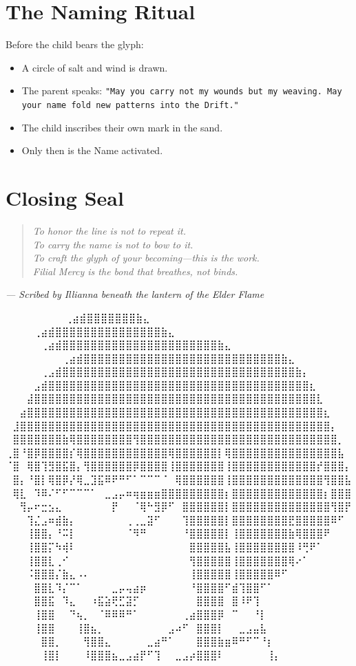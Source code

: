 \section*{The Naming Ritual}
Before the child bears the glyph:
\begin{itemize}
    \item A circle of salt and wind is drawn.
    \item The parent speaks:  
    \texttt{"May you carry not my wounds but my weaving.  
    May your name fold new patterns into the Drift."}
    \item The child inscribes their own mark in the sand.
    \item Only then is the Name activated.
\end{itemize}

\section*{Closing Seal}
\begin{quote}\itshape
To honor the line is not to repeat it.\\
To carry the name is not to bow to it.\\
To craft the glyph of your becoming—this is the work.\\
Filial Mercy is the bond that breathes, not binds.
\end{quote}

\begin{flushright}
\textit{— Scribed by Illianna beneath the lantern of the Elder Flame}
\end{flushright}

\iffalse
⠀⠀⠀⠀⠀⠀             ⠀⠀⢀⣴⣾⣿⣿⣿⣿⣿⣿⣿⣷⣄⠀⠀⠀⠀⠀⠀⠀⠀
⠀⠀⠀  ⠀      ⠀⠀⠀⠀⢀⣴⣾⣿⣿⣿⣿⣿⣿⣿⣿⣿⣿⣿⣿⣿⣿⣿⣷⣄⠀⠀⠀⠀⠀⠀⠀⠀
⠀⠀ ⠀   ⠀⠀⠀⠀⠀⢀⣴⣾⣿⣿⣿⣿⣿⣿⣿⣿⣿⣿⣿⣿⣿⣿⣿⣿⣿⣿⣿⣿⣿⣿⣷⣄⠀⠀⠀⠀⠀⠀⠀⠀
⠀⠀⠀⠀⠀⠀⠀⠀⢀⣴⣾⣿⣿⣿⣿⣿⣿⣿⣿⣿⣿⣿⣿⣿⣿⣿⣿⣿⣿⣿⣿⣿⣿⣿⣿⣿⣿⣿⣿⣷⣄⠀⠀⠀⠀⠀⠀⠀⠀
⠀⠀⠀⠀⠀⢀⣠⣾⣿⣿⣿⣿⣿⣿⣿⣿⣿⣿⣿⣿⣿⣿⣿⣿⣿⣿⣿⣿⣿⣿⣿⣿⣿⣿⣿⣿⣿⣿⣿⣿⣿⣷⡄⠀⠀⠀⠀⠀⠀
⠀⠀⠀⠀⣠⣾⣿⣿⣿⣿⣿⣿⣿⣿⣿⣿⣿⣿⣿⣿⣿⣿⣿⣿⣿⣿⣿⣿⣿⣿⣿⣿⣿⣿⣿⣿⣿⣿⣿⣿⣿⣿⣿⣆⠀⠀⠀⠀⠀
⠀⠀⠀⣼⣿⣿⣿⣿⣿⣿⣿⣿⣿⣿⣿⣿⣿⣿⣿⣿⣿⣿⣿⣿⣿⣿⣿⣿⣿⣿⣿⣿⣿⣿⣿⣿⣿⣿⣿⣿⣿⣿⣿⣿⣇⠀⠀⠀⠀
⠀⠀⣴⣿⣿⣿⣿⣿⣿⣿⣿⣿⣿⣿⣿⣿⣿⣿⣿⣿⣿⣿⣿⣿⣿⣿⣿⣿⣿⣿⣿⣿⣿⣿⣿⣿⣿⣿⣿⣿⣿⣿⣿⣿⣿⣆⠀⠀⠀
⠀⣸⣿⣿⣿⣿⣿⣿⣿⣿⣿⣿⣿⣿⣿⣿⣿⣿⣿⣿⣿⣿⣿⣿⣿⣿⣿⣿⣿⣿⣿⣿⣿⣿⣿⣿⣿⣿⣿⣿⣿⣿⣿⣿⣿⣿⡄⠀⠀
⠀⣿⣿⣿⣿⣿⣿⣿⣷⢿⣿⣿⣿⣿⣿⣿⣿⣿⢻⣿⣿⣿⣿⣿⣿⣿⣿⣿⣿⣿⣿⣿⣿⣿⣿⣿⣿⣿⣿⣿⣿⣿⣿⣿⣿⣿⣿⡀⠀
⢀⣿⠘⣿⡿⣿⣿⣿⣿⡎⢿⣿⣿⣿⣿⣿⣿⣿⣿⣿⣿⣿⣿⢿⣿⣿⣿⣿⣿⣿⡇⢿⣿⣿⣿⣿⣿⣿⣿⣿⣿⣿⣿⣿⣿⣿⣿⣧⠀
⠈⣿⠀⢿⣿⢹⣻⣿⣯⣿⡄⢻⣿⣿⣿⣿⣿⣿⡿⣿⣿⣿⣿⢸⣿⣿⣿⣿⣿⣿⣿⢸⣿⣿⣿⣿⣿⣿⣿⣿⣿⣿⣿⣿⡞⣿⣿⣿⡄
⠀⣿⡄⠘⣿⡇⢿⣿⡿⡜⢿⣀⣹⣯⠿⠟⠛⠋⠁⠉⠉⠉⠈⠀⢿⣿⣿⣿⣿⣿⣿⢸⣿⣿⣿⣿⣿⣿⣿⣿⣿⣿⣿⣿⣿⢻⣿⣿⣧
⠀⢿⣇⠀⠹⠿⠌⠋⠋⠉⠉⠉⠁⠀⣀⣠⡤⠶⢶⣶⣶⣶⣿⣿⣿⣿⣿⣿⣿⣿⣿⡆⣿⣿⣿⣿⣿⣿⣿⣿⣿⣿⣿⣿⣿⡆⣿⣿⣿
⠀⠀⢻⡤⠖⣒⣢⣄⠀⠀⠀⠀⠀⠀⠀⡟⠀⠀⠈⢿⠓⣻⡿⠋⠀⣿⣿⣿⣿⣿⣿⡇⣿⣿⣿⣿⣿⣿⣿⣿⣿⣿⣿⣿⣿⣿⢻⣿⡟
⠀⠀⠀⢹⣌⣠⠶⣾⣷⡄⠀⠀⠀⠀⠀⠀⠀⢀⢀⣀⣽⠋⠀⠀⠀⢹⣿⣿⣿⣿⣿⡇⣿⣿⣿⣿⣿⣿⣿⣿⣟⣿⣿⣿⣿⣿⠿⠋⠀
⠀⠀⠀⢸⣿⣿⡄⠘⠭⡇⠀⠀⠀⠀⠀⠀⠀⠈⠻⠛⠀⠀⠀⠀⠀⠘⣿⣿⣿⣿⣿⡇⢸⣿⣿⣿⣿⣿⣿⣿⣷⢿⣿⣿⣿⠟⠀⠀⠀
⠀⠀⠀⢸⣿⣿⡍⠳⢾⠇⠀⠀⠀⠀⠀⠀⠀⠀⠀⠀⠀⠀⠀⠀⠀⠀⣿⣿⣿⣿⣿⣧⢸⣿⣿⣿⣿⣿⣿⣿⣿⠸⢛⠟⠁⠀⠀⠀⠀
⠀⠀⠀⢸⣿⣿⣇⢀⠊⠀⠀⠀⠀⠀⠀⠀⠀⠀⠀⠀⠀⠀⠀⠀⠀⠀⢻⣿⣿⣿⣿⣿⢸⣿⣿⣿⣿⣿⣿⣿⢿⠔⠁⠀⠀⠀⠀⠀⠀
⠀⠀⠀⠨⣿⣿⣿⡌⣷⣄⠠⠄⠀⠀⠀⠀⠀⠀⠀⠀⠀⠀⠀⠀⠀⠀⢸⣿⣿⣿⣿⣿⢸⣿⣿⣿⣿⣿⠿⠋⠀⠀⠀⠀⠀⠀⠀⠀⠀
⠀⠀⠀⠀⣿⣿⣇⠹⡌⠉⠁⠀⠀⠀⠀⣀⡤⢤⣴⡶⠀⠀⠀⠀⠀⠀⠘⣿⣿⣿⣿⠋⣾⢹⣿⣿⠋⠁⠀⠀⠀⠀⠀⠀⠀⠀⠀⠀⠀
⠀⠀⠀⠀⣿⣿⣯⠀⠹⣄⠀⠀⠰⣯⣵⢟⣋⣽⡋⠀⠀⠀⠀⠀⠀⠀⠀⣿⣿⣿⣿⠀⣿⠸⠟⢹⠀⠀⠀⠀⠀⠀⠀⠀⠀⠀⠀⠀⠀
⠀⠀⠀⠀⢸⣿⣿⠀⠀⠙⢦⡀⠀⠈⠿⠿⠿⠛⠁⠀⠀⠀⠀⠀⠀⢀⣴⣿⣿⣿⡿⠀⠉⠀⠀⠘⡇⠀⠀⠀⠀⠀⠀⠀⠀⠀⠀⠀⠀
⠀⠀⠀⠀⢸⣿⣿⠀⠀⠀⢸⣿⣦⡀⠀⠀⠀⠀⠀⠀⠀⠀⠀⣠⠴⠋⠀⣿⣿⣿⡇⠀⠀⣀⣠⣤⣧⠀⠀⠀⠀⠀⠀⠀⠀⠀⠀⠀⠀
⠀⠀⠀⠀⠀⣿⣿⡀⠀⠀⠀⢻⣿⣿⣄⠀⠀⠀⠀⠀⣀⣴⠛⠁⠀⠀⠀⣿⣿⣿⣷⣶⠿⠛⠋⠉⠘⡆⠀⠀⠀⠀⠀⠀⠀⠀⠀⠀⠀
⠀⠀⠀⠀⠀⢸⣿⡇⠀⠀⠀⠸⣿⣿⣿⣦⣀⣠⣴⡟⠋⢹⠀⠀⣀⣠⡴⣿⣿⣿⠇⠀⠀⠀⠀⠀⠀⢸⡄⠀⠀⠀⠀⠀⠀⠀⠀⠀⠀

